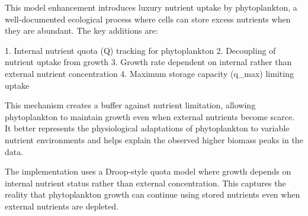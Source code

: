 This model enhancement introduces luxury nutrient uptake by phytoplankton, a well-documented ecological process where cells can store excess nutrients when they are abundant. The key additions are:

1. Internal nutrient quota (Q) tracking for phytoplankton
2. Decoupling of nutrient uptake from growth
3. Growth rate dependent on internal rather than external nutrient concentration
4. Maximum storage capacity (q_max) limiting uptake

This mechanism creates a buffer against nutrient limitation, allowing phytoplankton to maintain growth even when external nutrients become scarce. It better represents the physiological adaptations of phytoplankton to variable nutrient environments and helps explain the observed higher biomass peaks in the data.

The implementation uses a Droop-style quota model where growth depends on internal nutrient status rather than external concentration. This captures the reality that phytoplankton growth can continue using stored nutrients even when external nutrients are depleted.
